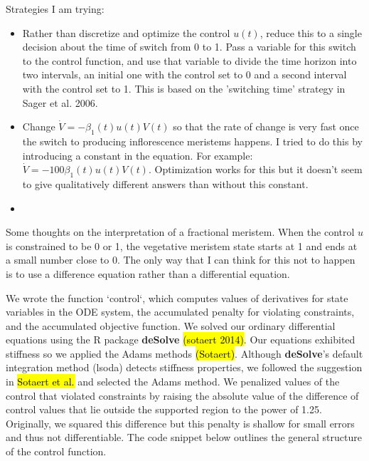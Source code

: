 \documentclass[12pt, oneside]{article}   	%
\begin{document}
Strategies I am trying:

\begin{itemize}

\item Rather than discretize and optimize the control $u(t)$, reduce this to a single decision about the time of switch from 0 to 1. Pass a variable for this switch to the control function, and use that variable to divide the time horizon into two intervals, an initial one with the control set to 0 and a second interval with the control set to 1. This is based on the 'switching time' strategy in Sager et al. 2006. 

\item Change $\dot{V} = - \beta_1(t) u(t) V(t)$ so that the rate of change is very fast once the switch to producing inflorescence meristems happens. I tried to do this by introducing a constant in the equation. For example: $\dot{V} = - 100 \beta_1(t) u(t) V(t)$. Optimization works for this but it doesn't seem to give qualitatively different answers than without this constant.

\item 

\end{itemize} 

Some thoughts on the interpretation of a fractional meristem. When the control $u$ is constrained to be 0 or 1, the vegetative meristem state starts at 1 and ends at a small number close to 0. The only way that I can think for this not to happen is to use a difference equation rather than a differential equation. 


We wrote the function `control`, which computes values of derivatives for state variables in the ODE system, the accumulated penalty for violating constraints, and the accumulated objective function. We solved our ordinary differential equations using the R package \textbf{deSolve} \hl{(sotaert 2014)}. Our equations exhibited stiffness so we applied the Adams methods \hl{(Sotaert)}. Although \textbf{deSolve}'s default integration method (lsoda) detects stiffness properties, we followed the suggestion in \hl{Sotaert et al.} and selected the Adams method. We penalized values of the control that violated constraints by raising the absolute value of the difference of control values that lie outside the supported region to the power of 1.25. Originally, we squared this difference but this penalty is shallow for small errors and thus not differentiable. The code snippet below outlines the general structure of the control function.
\end{document}

